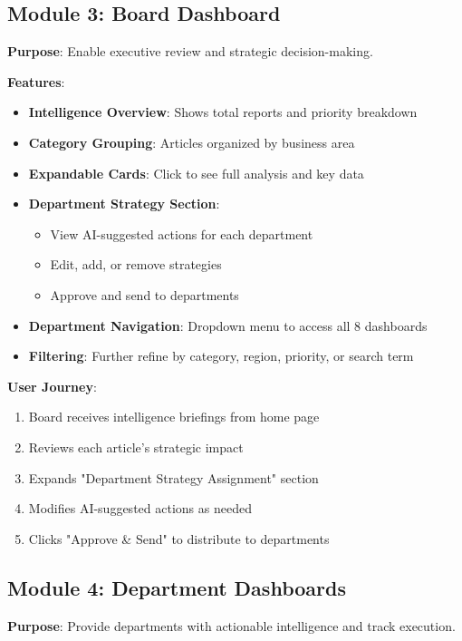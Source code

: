 \documentclass[11pt,a4paper]{article}
\begin{document}
\subsection{Module 3: Board Dashboard}

\textbf{Purpose}: Enable executive review and strategic decision-making.

\textbf{Features}:
\begin{itemize}[leftmargin=*]
    \item \textbf{Intelligence Overview}: Shows total reports and priority breakdown
    \item \textbf{Category Grouping}: Articles organized by business area
    \item \textbf{Expandable Cards}: Click to see full analysis and key data
    \item \textbf{Department Strategy Section}:
    \begin{itemize}
        \item View AI-suggested actions for each department
        \item Edit, add, or remove strategies
        \item Approve and send to departments
    \end{itemize}
    \item \textbf{Department Navigation}: Dropdown menu to access all 8 dashboards
    \item \textbf{Filtering}: Further refine by category, region, priority, or search term
\end{itemize}

\textbf{User Journey}:
\begin{enumerate}
    \item Board receives intelligence briefings from home page
    \item Reviews each article's strategic impact
    \item Expands "Department Strategy Assignment" section
    \item Modifies AI-suggested actions as needed
    \item Clicks "Approve \& Send" to distribute to departments
\end{enumerate}

\subsection{Module 4: Department Dashboards}

\textbf{Purpose}: Provide departments with actionable intelligence and track execution.
\end{document}
